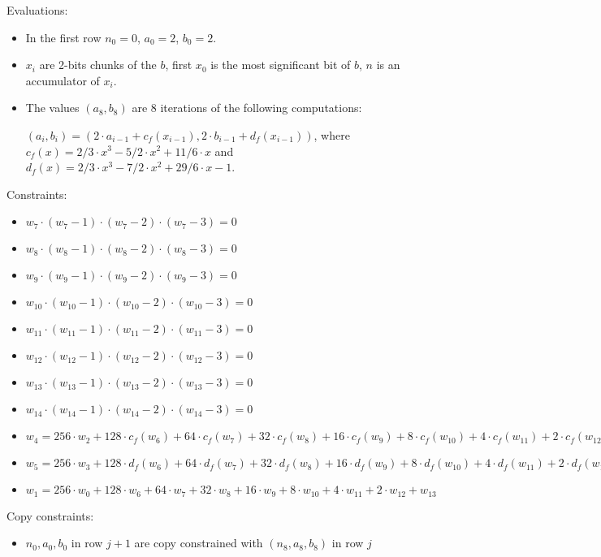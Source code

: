 Evaluations:
\begin{itemize}
	\item In the first row $n_0 = 0$, $a_0 = 2$, $b_0 = 2$.
	\item $x_i$ are 2-bits chunks of the $b$, first $x_0$ is the most significant bit of $b$, $n$ is an accumulator of $x_i$.
	\item The values $(a_8, b_8) $ are $8$ iterations of the following computations:
	\begin{center}
	$(a_i, b_i) = (2\cdot a_{i - 1} + c_f(x_{i - 1}), 2\cdot b_{i - 1} + d_f(x_{i - 1}))$, where $c_f(x) = 2/3\cdot x^3 - 5/2\cdot x^2 + 11/6 \cdot x$ and $d_f(x) = 2/3 \cdot x^3 - 7/2 \cdot x^2 + 29/6 \cdot x - 1$.
	\end{center}

\end{itemize}

Constraints:
\begin{itemize}
    \item $w_{7} \cdot (w_{7} - 1) \cdot (w_{7} - 2)\cdot (w_{7} - 3)  = 0$
    \item $w_{8} \cdot (w_{8} - 1) \cdot (w_{8} - 2)\cdot (w_{8} - 3)  = 0$
    \item $w_{9} \cdot (w_{9} - 1) \cdot (w_{9} - 2)\cdot (w_{9} - 3)  = 0$
    \item $w_{10} \cdot (w_{10} - 1) \cdot (w_{10} - 2)\cdot (w_{10} - 3)  = 0$
    \item $w_{11} \cdot (w_{11} - 1) \cdot (w_{11} - 2)\cdot (w_{11} - 3)  = 0$
    \item $w_{12} \cdot (w_{12} - 1) \cdot (w_{12} - 2)\cdot (w_{12} - 3)  = 0$
    \item $w_{13} \cdot (w_{13} - 1) \cdot (w_{13} - 2)\cdot (w_{13} - 3)  = 0$
    \item $w_{14} \cdot (w_{14} - 1) \cdot (w_{14} - 2)\cdot (w_{14} - 3)  = 0$
    \item $w_{4} = 256 \cdot w_{2} + 128 \cdot c_f(w_6) + 64 \cdot c_f(w_7) + 32 \cdot c_f(w_8) + 16 \cdot c_f(w_9) + 8 \cdot c_f(w_{10}) + 4 \cdot c_f(w_{11}) + 2 \cdot c_f(w_{12}) + c_f(w_{13})$
    \item $w_{5} = 256 \cdot w_{3} + 128 \cdot d_f(w_6) + 64 \cdot d_f(w_7) + 32 \cdot d_f(w_8) + 16 \cdot d_f(w_9) + 8 \cdot d_f(w_{10}) + 4 \cdot d_f(w_{11}) + 2 \cdot d_f(w_{12}) + d_f(w_{13})$
    \item $w_{1} = 256 \cdot w_{0} + 128 \cdot w_6 + 64 \cdot w_7 + 32 \cdot w_8 + 16 \cdot w_9 + 8 \cdot w_{10} + 4 \cdot w_{11} + 2 \cdot w_{12} + w_{13}$
\end{itemize}

    Copy constraints:
    \begin{itemize}
    \item $n_0, a_0, b_0$ in row $j + 1$ are copy constrained with $(n_8, a_8, b_8)$ in row $j$ 
    \end{itemize}
